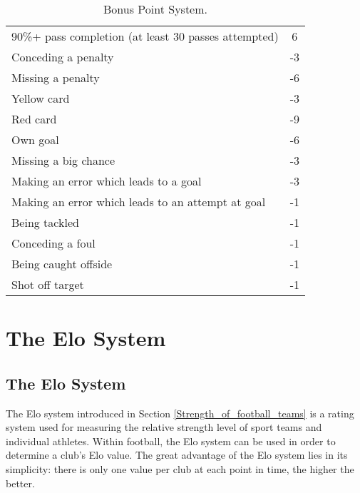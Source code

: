 \begin{table}[H]
\begin{tabular}{|l|c|}
90\%+ pass completion (at least 30 passes attempted)                     & 6   \\
Conceding a penalty                                                      & -3  \\
Missing a penalty                                                        & -6  \\
Yellow card                                                              & -3  \\
Red card                                                                 & -9  \\
Own goal                                                                 & -6  \\
Missing a big chance                                                     & -3  \\
Making an error which leads to a goal                                    & -3  \\
Making an error which leads to an attempt at goal                        & -1  \\
Being tackled                                                            & -1  \\
Conceding a foul                                                         & -1  \\
Being caught offside                                                     & -1  \\
Shot off target                                                          & -1 \\
\hline
\end{tabular}
\caption{Bonus Point System.}
\end{table}



\chapter{The Elo System}
\section{The Elo System}
\label{A2_Elo_System}

The Elo system introduced in Section \ref{Strength_of_football_teams} is a rating system used for measuring the relative strength level of sport teams and individual athletes. Within football, the Elo system can be used in order to determine a club's Elo value. The great advantage of the Elo system lies in its simplicity: there is only one value per club at each point in time, the higher the better. 


